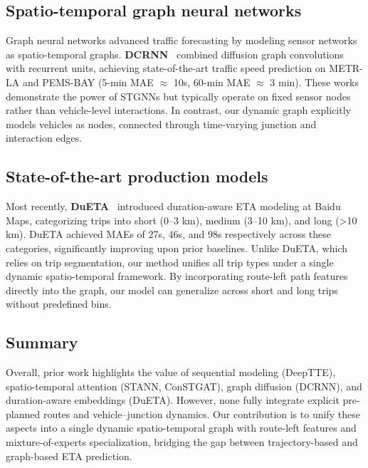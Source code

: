 \subsection{Spatio-temporal graph neural networks}
Graph neural networks advanced traffic forecasting by modeling sensor networks as spatio-temporal graphs. \textbf{DCRNN}~\cite{dcrnn2018} combined diffusion graph convolutions with recurrent units, achieving state-of-the-art traffic speed prediction on METR-LA and PEMS-BAY (5-min MAE $\approx$ 10s, 60-min MAE $\approx$ 3 min). These works demonstrate the power of STGNNs but typically operate on fixed sensor nodes rather than vehicle-level interactions. In contrast, our dynamic graph explicitly models vehicles as nodes, connected through time-varying junction and interaction edges.

\subsection{State-of-the-art production models}
Most recently, \textbf{DuETA}~\cite{dueta2023} introduced duration-aware ETA modeling at Baidu Maps, categorizing trips into short (0–3 km), medium (3–10 km), and long (>10 km). DuETA achieved MAEs of 27s, 46s, and 98s respectively across these categories, significantly improving upon prior baselines. Unlike DuETA, which relies on trip segmentation, our method unifies all trip types under a single dynamic spatio-temporal framework. By incorporating route-left path features directly into the graph, our model can generalize across short and long trips without predefined bins.

\subsection{Summary}
Overall, prior work highlights the value of sequential modeling (DeepTTE), spatio-temporal attention (STANN, ConSTGAT), graph diffusion (DCRNN), and duration-aware embeddings (DuETA). However, none fully integrate explicit pre-planned routes and vehicle–junction dynamics. Our contribution is to unify these aspects into a single dynamic spatio-temporal graph with route-left features and mixture-of-experts specialization, bridging the gap between trajectory-based and graph-based ETA prediction.
